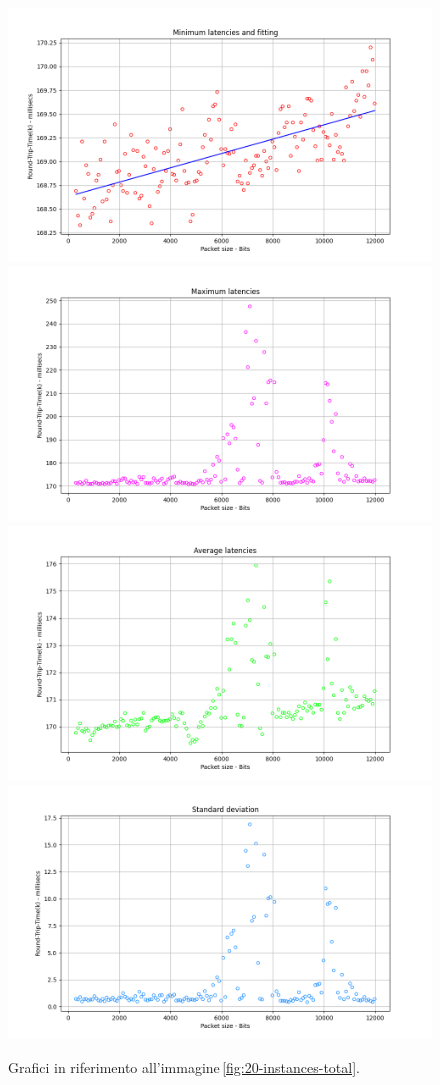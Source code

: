 \begin{figure}[h]
    \centering
    \includegraphics[width = .49\textwidth]{hw-2/report/imgs/20-instances/la-min-latencies.png}
    \includegraphics[width = .49\textwidth]{hw-2/report/imgs/20-instances/la-max-latencies.png}
    \includegraphics[width = .49\textwidth]{hw-2/report/imgs/20-instances/la-avg-latencies.png}
    \includegraphics[width = .49\textwidth]{hw-2/report/imgs/20-instances/la-standard-deviation.png}
    \caption{Grafici in riferimento all'immagine\,\ref{fig:20-instances-total}.}
    \label{fig:20-instances-stats}
\end{figure}

